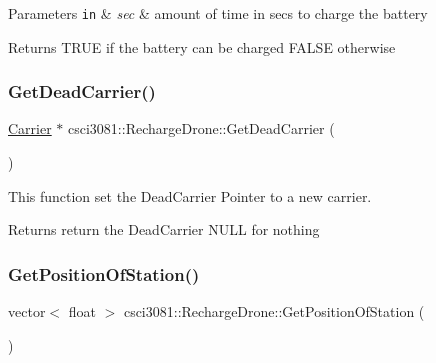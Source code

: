 \begin{DoxyParams}[1]{Parameters}
\mbox{\tt in}  & {\em sec} & amount of time in secs to charge the battery \\
\hline
\end{DoxyParams}
\begin{DoxyReturn}{Returns}
T\+R\+UE if the battery can be charged F\+A\+L\+SE otherwise 
\end{DoxyReturn}
\mbox{\label{classcsci3081_1_1RechargeDrone_a3e8eae4e2d65ba366f0935354262d48a}} 
\subsubsection{\texorpdfstring{Get\+Dead\+Carrier()}{GetDeadCarrier()}}
{\footnotesize\ttfamily \hyperlink{classcsci3081_1_1Carrier}{Carrier} $\ast$ csci3081\+::\+Recharge\+Drone\+::\+Get\+Dead\+Carrier (\begin{DoxyParamCaption}{ }\end{DoxyParamCaption})}



This function set the Dead\+Carrier Pointer to a new carrier. 

\begin{DoxyReturn}{Returns}
return the Dead\+Carrier N\+U\+LL for nothing 
\end{DoxyReturn}
\mbox{\label{classcsci3081_1_1RechargeDrone_aa8116aa4337b43f649adaf21db0d0b08}} 
\subsubsection{\texorpdfstring{Get\+Position\+Of\+Station()}{GetPositionOfStation()}}
{\footnotesize\ttfamily vector$<$ float $>$ csci3081\+::\+Recharge\+Drone\+::\+Get\+Position\+Of\+Station (\begin{DoxyParamCaption}{ }\end{DoxyParamCaption})}



